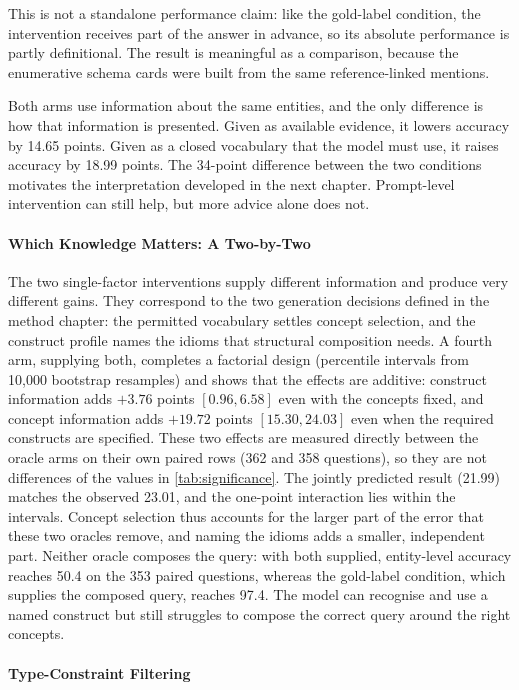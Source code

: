 This is not a standalone performance claim: like the gold-label condition, the intervention receives part of the answer in advance, so its absolute performance is partly definitional.
The result is meaningful as a comparison, because the enumerative schema cards were built from the same reference-linked mentions.

Both arms use information about the same entities, and the only difference is how that information is presented.
Given as available evidence, it lowers accuracy by 14.65 points.
Given as a closed vocabulary that the model must use, it raises accuracy by 18.99 points.
The 34-point difference between the two conditions motivates the interpretation developed in the next chapter. Prompt-level intervention can still help, but more advice alone does not.

\paragraph{Which Knowledge Matters: A
Two-by-Two}

The two single-factor interventions supply different information and produce very different gains.
They correspond to the two generation decisions defined in the method chapter: the permitted vocabulary settles concept selection, and the construct profile names the idioms that structural composition needs.
A fourth arm, supplying both, completes a factorial design (percentile intervals from 10,000 bootstrap resamples) and shows that the effects are additive: construct information adds $+3.76$ points $[0.96, 6.58]$ even with the concepts fixed, and concept information adds $+19.72$ points $[15.30, 24.03]$ even when the required constructs are specified.
These two effects are measured directly between the oracle arms on their own paired rows (362 and 358 questions), so they are not differences of the values in \cref{tab:significance}.
The jointly predicted result (21.99) matches the observed 23.01, and the one-point interaction lies within the intervals.
Concept selection thus accounts for the larger part of the error that these two oracles remove, and naming the idioms adds a smaller, independent part.
Neither oracle composes the query: with both supplied, entity-level accuracy reaches 50.4 on the 353 paired questions, whereas the gold-label condition, which supplies the composed query, reaches 97.4.
The model can recognise and use a named construct but still struggles to compose the correct query around the right concepts.

\paragraph{Type-Constraint Filtering}

